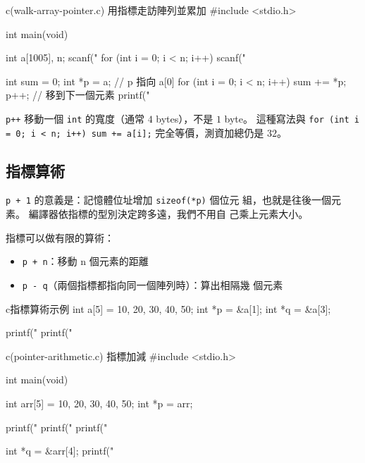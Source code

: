 \begin{example}{c}{(walk-array-pointer.c) 用指標走訪陣列並累加}
#include <stdio.h>

int main(void) {
    int a[1005], n;
    scanf("%
    for (int i = 0; i < n; i++) {
        scanf("%
    }

    int sum = 0;
    int *p = a;              // p 指向 a[0]
    for (int i = 0; i < n; i++) {
        sum += *p;
        p++;                 // 移到下一個元素
    }
    printf("%
}
\end{example}


\texttt{p++} 移動一個 \texttt{int} 的寬度（通常 $4$ bytes），不是
$1$ byte。 這種寫法與 \texttt{for (int i = 0; i < n; i++) sum +=
a[i];} 完全等價，測資加總仍是 $32$。

\subsection{指標算術}

\texttt{p + 1} 的意義是：記憶體位址增加 \texttt{sizeof(*p)} 個位元
組，也就是往後一個元素。 編譯器依指標的型別決定跨多遠，我們不用自
己乘上元素大小。

指標可以做有限的算術：
\begin{itemize}
  \item \texttt{p + n}：移動 n 個元素的距離
  \item \texttt{p - q}（兩個指標都指向同一個陣列時）：算出相隔幾
        個元素
\end{itemize}

\begin{code}{c}{指標算術示例}
int a[5] = {10, 20, 30, 40, 50};
int *p = &a[1];
int *q = &a[3];

printf("%
printf("%
\end{code}

\begin{example}{c}{(pointer-arithmetic.c) 指標加減}
#include <stdio.h>

int main(void) {
    int arr[5] = {10, 20, 30, 40, 50};
    int *p = arr;

    printf("%
    printf("%
    printf("%

    int *q = &arr[4];
    printf("%
}
\end{example}

